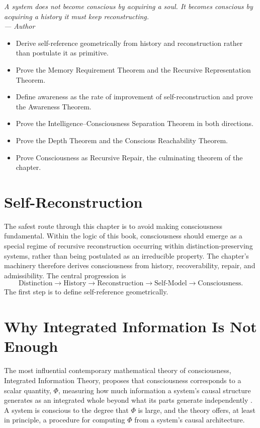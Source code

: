 \documentclass[12pt,twoside,openright]{book}
\newenvironment{epigraph}[2]{%
  \vspace{1em}\begin{flushright}
  \begin{minipage}{0.72\textwidth}
  \itshape\small #1\\[0.4em]
  \upshape\footnotesize\sffamily\color{DistGray}--- #2
  \end{minipage}\end{flushright}\vspace{1.5em}}{}
\newenvironment{objectives}{%
  \begin{tcolorbox}[colback=DistBlue!5,colframe=DistBlue,
    title={\faCheckCircle\enspace Learning Objectives},
    fonttitle=\sffamily\bfseries\color{white},
    attach boxed title to top left={yshift=-2mm,xshift=4mm},
    boxed title style={colback=DistBlue},breakable]
  \begin{itemize}[leftmargin=*,nosep]}{%
  \end{itemize}\end{tcolorbox}\vspace{1em}}
\begin{document}
\begin{epigraph}{%
  A system does not become conscious by acquiring a soul.
  It becomes conscious by acquiring a history it must
  keep reconstructing.}%
  {Author}
\end{epigraph}

\begin{objectives}
  \item Derive self-reference geometrically from history
        and reconstruction rather than postulate it as
        primitive.
  \item Prove the Memory Requirement Theorem and the
        Recursive Representation Theorem.
  \item Define awareness as the rate of improvement of
        self-reconstruction and prove the Awareness Theorem.
  \item Prove the Intelligence--Consciousness Separation
        Theorem in both directions.
  \item Prove the Depth Theorem and the Conscious
        Reachability Theorem.
  \item Prove Consciousness as Recursive Repair, the
        culminating theorem of the chapter.
\end{objectives}

\section{Self-Reconstruction}
\label{sec:ch21-self-reconstruction}

The safest route through this chapter is to avoid making
consciousness fundamental. Within the logic of this book,
consciousness should emerge as a special regime of
recursive reconstruction occurring within
distinction-preserving systems, rather than being
postulated as an irreducible property. The chapter's
machinery therefore derives consciousness from history,
recoverability, repair, and admissibility. The central
progression is
\[
  \text{Distinction} \to \text{History} \to \text{Reconstruction}
  \to \text{Self-Model} \to \text{Consciousness}.
\]
The first step is to define self-reference geometrically.

\section{Why Integrated Information Is Not Enough}
\label{sec:ch21-why-iit}

The most influential contemporary mathematical theory of
consciousness, Integrated Information Theory, proposes that
consciousness corresponds to a scalar quantity, $\Phi$,
measuring how much information a system's causal structure
generates as an integrated whole beyond what its parts
generate independently \parencite{tononi2015}. A system is
conscious to the degree that $\Phi$ is large, and the theory
offers, at least in principle, a procedure for computing
$\Phi$ from a system's causal architecture.
\end{document}
